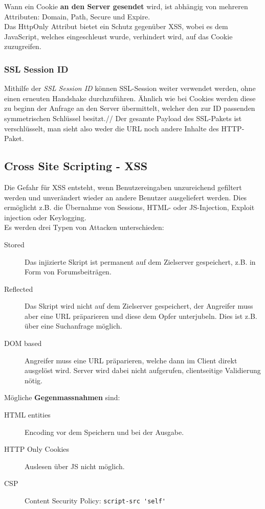 Wann ein Cookie \textbf{an den Server gesendet} wird, ist abhängig von mehreren Attributen: Domain, Path, Secure und Expire.\\
Das HttpOnly Attribut bietet ein Schutz gegenüber XSS, wobei es dem JavaScript, welches eingeschleust wurde, verhindert wird, auf das Cookie zuzugreifen.

\subsubsection{SSL Session ID}
Mithilfe der \textit{SSL Session ID} können SSL-Session weiter verwendet werden, ohne einen erneuten Handshake durchzuführen. Ähnlich wie bei Cookies werden diese zu beginn der Anfrage an den Server übermittelt, welcher den zur ID passenden symmetrischen Schlüssel besitzt.//
Der gesamte Payload des SSL-Pakets ist verschlüsselt, man sieht also weder die URL noch andere Inhalte des HTTP-Paket.

\subsection{Cross Site Scripting - XSS}
Die Gefahr für XSS entsteht, wenn Benutzereingaben unzureichend gefiltert werden und unverändert wieder an andere Benutzer ausgeliefert werden. Dies ermöglicht z.B. die Übernahme von Sessions, HTML- oder JS-Injection, Exploit injection oder Keylogging.\\
Es werden drei Typen von Attacken unterschieden:
\begin{description}
	\item[Stored] Das injizierte Skript ist permanent auf dem Zielserver gespeichert, z.B. in Form von Forumsbeiträgen.
	\item[Reflected] Das Skript wird nicht auf dem Zielserver gespeichert, der Angreifer muss aber eine URL präparieren und diese dem Opfer unterjubeln. Dies ist z.B. über eine Suchanfrage möglich.
	\item[DOM based] Angreifer muss eine URL präparieren, welche dann im Client direkt ausgelöst wird. Server wird dabei nicht aufgerufen, clientseitige Validierung nötig.
\end{description}

Mögliche \textbf{Gegenmassnahmen} sind:
\begin{description}
	\item[HTML entities] Encoding vor dem Speichern und bei der Ausgabe.
	\item[HTTP Only Cookies] Auslesen über JS nicht möglich.
	\item[CSP] Content Security Policy: \lstinline|script-src 'self'|
\end{description}

